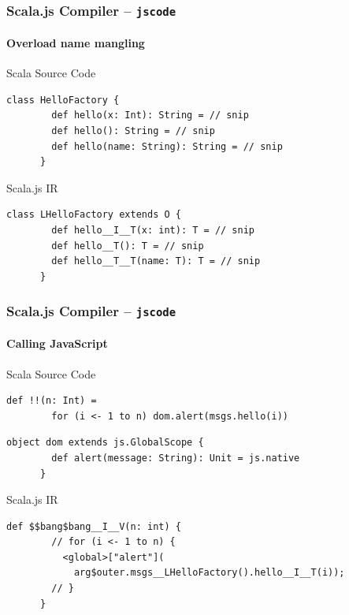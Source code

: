 \documentclass{beamer}
\begin{document}
\begin{frame}[fragile]
  \frametitle{Scala.js Compiler -- \texttt{jscode}}
  \framesubtitle{Overload name mangling}

  \begin{block}{Scala Source Code}
    \begin{lstlisting}[gobble=6]
      class HelloFactory {
        def hello(x: Int): String = // snip
        def hello(): String = // snip
        def hello(name: String): String = // snip
      }
    \end{lstlisting}
  \end{block}

  \pause

  \begin{block}{Scala.js IR}
    \begin{lstlisting}[gobble=6]
      class LHelloFactory extends O {
        def hello__I__T(x: int): T = // snip
        def hello__T(): T = // snip
        def hello__T__T(name: T): T = // snip
      }
    \end{lstlisting}
  \end{block}

\end{frame}

\begin{frame}[fragile]
  \frametitle{Scala.js Compiler -- \texttt{jscode}}
  \framesubtitle{Calling JavaScript}


  \begin{block}{Scala Source Code}
    \begin{lstlisting}[gobble=6]
      def !!(n: Int) =
        for (i <- 1 to n) dom.alert(msgs.hello(i))
    \end{lstlisting}

    \pause

    \begin{lstlisting}[gobble=6]
      object dom extends js.GlobalScope {
        def alert(message: String): Unit = js.native
      }
    \end{lstlisting}
  \end{block}

  \pause

  \begin{block}{Scala.js IR}
    \begin{lstlisting}[gobble=6]
      def $$bang$bang__I__V(n: int) {
        // for (i <- 1 to n) {
          <global>["alert"](
            arg$outer.msgs__LHelloFactory().hello__I__T(i));
        // }
      }
    \end{lstlisting}
  \end{block}

\end{frame}
\end{document}
